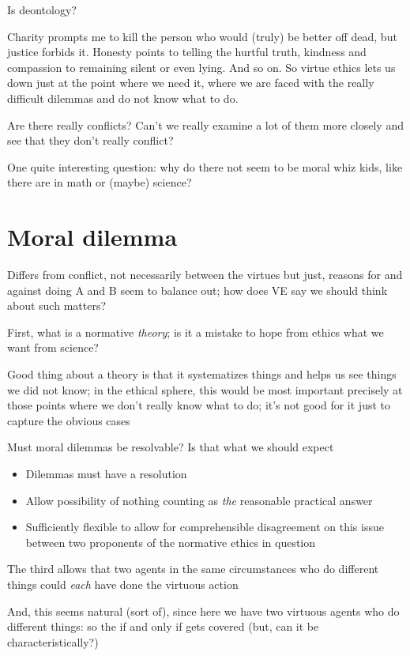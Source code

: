 \documentclass[11pt]{article}
\begin{document}
\noindent Is deontology?
\vspace*{2mm}

\noindent Charity prompts me to kill the person who would (truly) be better off dead, but justice forbids it. Honesty points to telling the hurtful truth, kindness and compassion to remaining silent or even lying. And so on. So virtue ethics lets us down just at the point where we need it, where we are faced with the really difficult dilemmas and do not know what to do.
\vspace*{2mm}

\noindent Are there really conflicts? Can't we really examine a lot of them more closely and see that they don't really conflict?
\vspace*{2mm}

\noindent One quite interesting question: why do there not seem to be moral whiz kids, like there are in math or (maybe) science?

\section*{Moral dilemma}

\noindent Differs from conflict, not necessarily between the virtues but just, reasons for and against doing A and B seem to balance out; how does VE say we should think about such matters?
\vspace*{2mm}

\noindent First, what is a normative \emph{theory}; is it a mistake to hope from ethics what we want from science?
\vspace*{2mm}

\noindent Good thing about a theory is that it systematizes things and helps us see things we did not know; in the ethical sphere, this would be most important precisely at those points where we don't really know what to do; it's not good for it just to capture the obvious cases
\vspace*{2mm}

\noindent Must moral dilemmas be resolvable? Is that what we should expect

\begin{itemize}\item{Dilemmas must have a resolution}\item{Allow possibility of nothing counting as \emph{the} reasonable practical answer}\item{Sufficiently flexible to allow for comprehensible disagreement on this issue between two proponents of the normative ethics in question}\end{itemize}

\noindent The third allows that two agents in the same circumstances who do different things could \emph{each} have done the virtuous action
\vspace*{2mm}

\noindent And, this seems natural (sort of), since here we have two virtuous agents who do different things: so the if and only if gets covered (but, can it be characteristically?)
\end{document}
